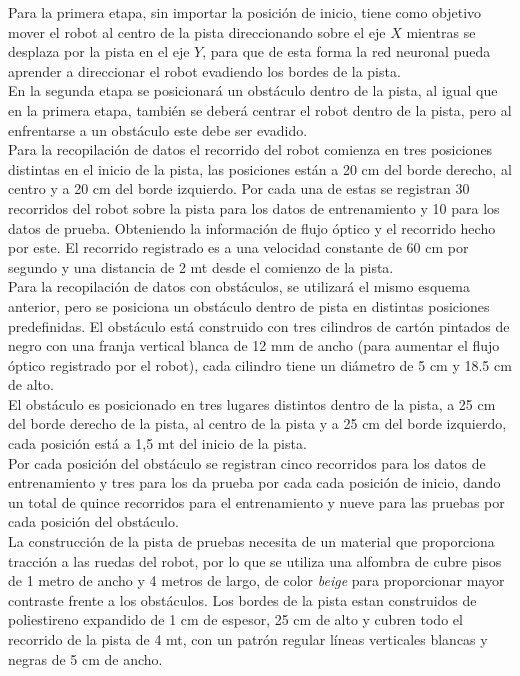 \documentclass{iccmemoria}
\begin{document}
Para la primera etapa, sin importar la posición de inicio, tiene como objetivo mover el robot al centro de la pista direccionando sobre el eje $X$ mientras se desplaza por la pista en el eje $Y$, para que de esta forma la red neuronal pueda aprender a direccionar el robot evadiendo los bordes de la pista.\\
 
En la segunda etapa se posicionará un obstáculo dentro de la pista, al igual que en la primera etapa, también se deberá centrar el robot dentro de la pista, pero al enfrentarse a un obstáculo este debe ser evadido.\\

Para la recopilación de datos el recorrido del robot comienza en tres posiciones distintas en el inicio de la pista, las posiciones están a 20 cm del borde derecho, al centro y a 20 cm del borde izquierdo. Por cada una de estas se registran 30 recorridos del robot sobre la pista para los datos de entrenamiento y 10 para los datos de prueba. Obteniendo la información de flujo óptico y el recorrido hecho por este. El recorrido registrado es a una velocidad constante de 60 cm por segundo y una distancia de 2 mt desde el comienzo de la pista.\\
 
Para la recopilación de datos con obstáculos, se utilizará el mismo esquema anterior, pero se posiciona un obstáculo dentro de pista en distintas posiciones predefinidas. El obstáculo está construido con tres cilindros de cartón pintados de negro con una franja vertical blanca de 12 mm de ancho (para aumentar el flujo óptico registrado por el robot), cada cilindro tiene un diámetro de 5 cm y 18.5 cm de alto.\\

El obstáculo es posicionado en tres lugares distintos dentro de la pista, a 25 cm del borde derecho de la pista, al centro de la pista y a 25 cm del borde izquierdo, cada posición está a 1,5 mt del inicio de la pista.\\

Por cada posición del obstáculo se registran cinco recorridos para los datos de entrenamiento y tres para los da prueba por cada cada posición de inicio, dando un total de quince recorridos para el entrenamiento y nueve para las pruebas por cada posición del obstáculo.\\
 
La construcción de la pista de pruebas necesita de un material que proporciona tracción a las ruedas del robot, por lo que se utiliza una alfombra de cubre pisos de 1 metro de ancho y 4 metros de largo, de color \emph{beige} para proporcionar mayor contraste frente a los obstáculos. Los bordes de la pista estan construidos de poliestireno expandido de 1 cm de espesor, 25 cm de alto y cubren todo el recorrido de la pista de 4 mt, con un patrón regular líneas verticales blancas y negras de 5 cm de ancho.
\end{document}
